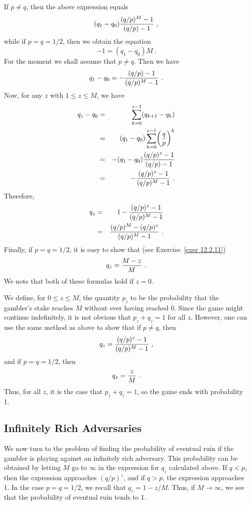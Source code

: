 If $p \ne q$, then the above expression equals
$$(q_1 - q_0) {{(q/p)^M - 1}\over{(q/p) - 1}}\ ,$$
while if $p = q = 1/2$, then we obtain the equation
$$-1 = (q_1 - q_0) M\ .$$
For the moment we shall assume that $p \ne q$.   Then we have
$$q_1 - q_0 = -{{(q/p) - 1}\over{(q/p)^M - 1}}\ .$$
Now, for any $z$ with $1 \le z \le M$, we have
\begin{eqnarray*}
q_z - q_0 &=& \sum_{k = 0}^{z-1} (q_{k+1} - q_k)\\
          &=& (q_1 - q_0)\sum_{k = 0}^{z-1} \biggl({q\over p}\biggr)^k\\
          &=& -(q_1 - q_0){{(q/p)^z - 1}\over{(q/p) - 1}}\\
          &=& -{{(q/p)^z - 1}\over{(q/p)^M - 1}}\ .
\end{eqnarray*}
Therefore,
\begin{eqnarray*}
q_z &=& 1 - {{(q/p)^z - 1}\over{(q/p)^M - 1}}\\
    &=& {{(q/p)^M - (q/p)^z}\over{(q/p)^M - 1}}\ .
\label{eq 12.2.3}
\end{eqnarray*}
Finally, if $p = q = 1/2$, it is easy to show that (see Exercise~\ref{exer 12.2.11})
$$q_z = {{M - z}\over M}\ .$$
We note that both of these formulas hold if $z = 0$.
\par
We define, for $0 \le z \le M$, the quantity $p_z$ to be the probability that the gambler's
stake reaches $M$ without ever having reached 0.  Since the game might continue indefinitely, it
is not obvious that $p_z + q_z = 1$ for all $z$.  However, one can use the same method as above
to show that if $p \ne q$, then
$$q_z = {{(q/p)^z - 1}\over{(q/p)^M - 1}}\ ,$$
and if $p = q = 1/2$, then
$$q_z = {z\over M}\ .$$
Thus, for all $z$, it is the case that $p_z + q_z = 1$, so the game ends with probability 1.

\subsection*{Infinitely Rich Adversaries}

We now turn to the problem of finding the probability of eventual ruin if the gambler is playing
against an infinitely rich adversary.  This probability can be obtained by letting $M$ go to
$\infty$ in the expression for $q_z$ calculated above.  If $q < p$, then the expression approaches
$(q/p)^z$, and if $q > p$, the expression approaches 1.  In the case $p = q = 1/2$, we recall
that $q_z = 1 - z/M$.  Thus, if $M \rightarrow \infty$, we see that the probability of eventual
ruin tends to 1.  

